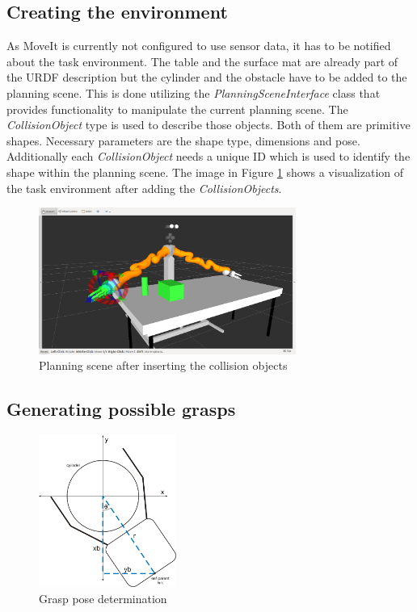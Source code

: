 \subsection{Creating the environment}

As MoveIt is currently not configured to use sensor data, it has to be notified about the task environment. The table and the surface mat are already part of the URDF description but the cylinder and the obstacle have to be added to the planning scene. This is done utilizing the \emph{PlanningSceneInterface} class that provides functionality to manipulate the current planning scene. The \emph{CollisionObject} type is used to describe those objects. Both of them are primitive shapes. Necessary parameters are the shape type, dimensions and pose. Additionally each \emph{CollisionObject} needs a unique ID which is used to identify the shape within the planning scene. The image in Figure \ref{fig:task_env} shows a visualization of the task environment after adding the \emph{CollisionObjects}.

\begin{figure}[ht]
	\centering
  	\includegraphics[width=0.75\textwidth]{images/task_env.png}
	\caption{Planning scene after inserting the collision objects}
	\label{fig:task_env}
\end{figure}

\subsection{Generating possible grasps}

\begin{figure}[ht]
	\centering
  	\includegraphics[width=0.4\textwidth]{images/grasps.jpg}
	\caption{Grasp pose determination}
	\label{fig:grasp_pose}
\end{figure}

